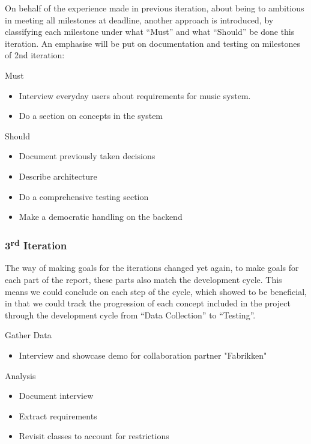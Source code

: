	On behalf of the experience made in previous iteration, about being to ambitious in meeting all milestones at deadline, another approach is introduced, by classifying each milestone under what \enquote{Must} and what \enquote{Should} be done this iteration. An emphasise will be put on documentation and testing on milestones of 2nd iteration:

	Must
	\begin{itemize}
		\item Interview everyday users about requirements for music system.
		\item Do a section on concepts in the system
	\end{itemize}

	Should
	\begin{itemize}
		\item Document previously taken decisions
		\item Describe architecture
		\item Do a comprehensive testing section
		\item Make a democratic handling on the backend
	\end{itemize}

\subsubsection{3\textsuperscript{rd} Iteration}

  The way of making goals for the iterations changed yet again, to make goals for each part of the report, these parts also match the development cycle. This means we could conclude on each step of the cycle, which showed to be beneficial, in that we could track the progression of each concept included in the project through the development cycle from \enquote{Data Collection} to \enquote{Testing}.

  Gather Data
  \begin{itemize}
    \item Interview and showcase demo for collaboration partner "Fabrikken"
  \end{itemize}

  Analysis
  \begin{itemize}
    \item Document interview
    \item Extract requirements
    \item Revisit classes to account for restrictions
  \end{itemize}

